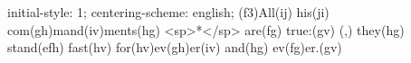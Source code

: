 initial-style: 1;
centering-scheme: english;
(f3)All(ij) his(ji) com(gh)mand(iv)ments(hg) <sp>*</sp> are(fg) true:(gv) (,) they(hg) stand(efh) fast(hv) for(hv)ev(gh)er(iv) and(hg) ev(fg)er.(gv)
